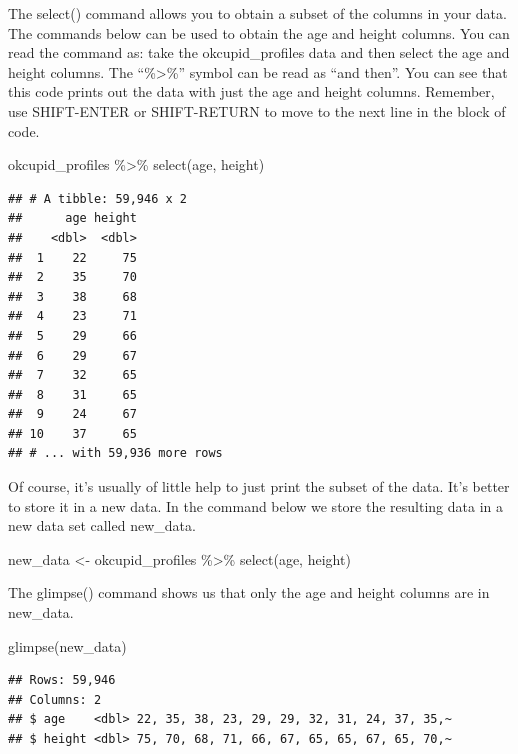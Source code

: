 \documentclass[
]{krantz}
\makeatletter
\newenvironment{Shaded}{\begin{snugshade}}{\end{snugshade}}
\newcommand{\FunctionTok}[1]{\textcolor[rgb]{0,0,0}{#1}}
\newcommand{\NormalTok}[1]{#1}
\newcommand{\OtherTok}[1]{\textcolor[rgb]{0.37,0.37,0.37}{#1}}
\newcommand{\SpecialCharTok}[1]{\textcolor[rgb]{0,0,0}{#1}}
\newenvironment{kframe}{%
\medskip{}
\setlength{\fboxsep}{.8em}
 \def\at@end@of@kframe{}%
 \ifinner\ifhmode%
  \def\at@end@of@kframe{\end{minipage}}%
  \begin{minipage}{\columnwidth}%
 \fi\fi%
 \def\FrameCommand##1{\hskip\@totalleftmargin \hskip-\fboxsep
 \colorbox{shadecolor}{##1}\hskip-\fboxsep
     \hskip-\linewidth \hskip-\@totalleftmargin \hskip\columnwidth}%
 \MakeFramed {\advance\hsize-\width
   \@totalleftmargin\z@ \linewidth\hsize
   \@setminipage}}%
 {\par\unskip\endMakeFramed%
 \at@end@of@kframe}
\renewenvironment{Shaded}{\begin{kframe}}{\end{kframe}}
\makeatother
\begin{document}
The select() command allows you to obtain a subset of the columns in your data. The commands below can be used to obtain the age and height columns. You can read the command as: take the okcupid\_profiles data and then select the age and height columns. The ``\%\textgreater\%'' symbol can be read as ``and then''. You can see that this code prints out the data with just the age and height columns. Remember, use SHIFT-ENTER or SHIFT-RETURN to move to the next line in the block of code.

\begin{Shaded}
\begin{Highlighting}[]
\NormalTok{okcupid\_profiles }\SpecialCharTok{\%\textgreater{}\%} 
  \FunctionTok{select}\NormalTok{(age, height)}
\end{Highlighting}
\end{Shaded}

\begin{verbatim}
## # A tibble: 59,946 x 2
##      age height
##    <dbl>  <dbl>
##  1    22     75
##  2    35     70
##  3    38     68
##  4    23     71
##  5    29     66
##  6    29     67
##  7    32     65
##  8    31     65
##  9    24     67
## 10    37     65
## # ... with 59,936 more rows
\end{verbatim}

Of course, it's usually of little help to just print the subset of the data. It's better to store it in a new data. In the command below we store the resulting data in a new data set called new\_data.

\begin{Shaded}
\begin{Highlighting}[]
\NormalTok{new\_data }\OtherTok{\textless{}{-}}\NormalTok{ okcupid\_profiles }\SpecialCharTok{\%\textgreater{}\%} 
  \FunctionTok{select}\NormalTok{(age, height)}
\end{Highlighting}
\end{Shaded}

The glimpse() command shows us that only the age and height columns are in new\_data.

\begin{Shaded}
\begin{Highlighting}[]
\FunctionTok{glimpse}\NormalTok{(new\_data)}
\end{Highlighting}
\end{Shaded}

\begin{verbatim}
## Rows: 59,946
## Columns: 2
## $ age    <dbl> 22, 35, 38, 23, 29, 29, 32, 31, 24, 37, 35,~
## $ height <dbl> 75, 70, 68, 71, 66, 67, 65, 65, 67, 65, 70,~
\end{verbatim}
\end{document}
